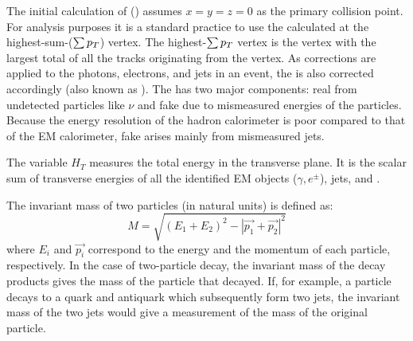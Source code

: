 The initial calculation of \met (\metRaw) assumes $x=y=z=0$ as the primary collision point. For analysis purposes it is a standard practice to use the \met calculated at the highest-sum-\pt ($\textstyle \sum\mbox{$p_T$}$) vertex. The highest-$\textstyle \sum \mbox{$p_T$}$ vertex is the vertex with the largest total \pt of all the tracks originating from the vertex. As corrections are applied to the photons, electrons, and jets in an event, the \met is also corrected accordingly (also known as \metCorr). The \met has two major components: real \met from undetected particles like $\nu$ and fake \met due to mismeasured energies of the particles. Because the energy resolution of the hadron calorimeter is poor compared to that of the EM calorimeter, fake \met arises mainly from mismeasured jets.

The variable $H_{T}$ measures the total energy in the transverse plane. It is the scalar sum of transverse energies of all the identified EM objects ($\gamma, e^{\pm}$), jets, and \met.

The invariant mass of two particles (in natural units) is defined as:
\begin{equation}
 M = \sqrt{(E_{1}+E_{2})^{2}-|\vec{p_{1}}+\vec{p_{2}}|^{2}}
\end{equation}
where $E_{i}$ and $\vec{p_{i}}$ correspond to the energy and the momentum of each particle, respectively.  In the case of two-particle decay, the invariant mass of the decay products gives the mass of the particle that decayed.  If, for example, a particle decays to a quark and antiquark which subsequently form two jets, the invariant mass of the two jets would give a measurement of the mass of the original particle.
